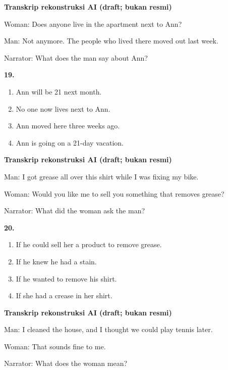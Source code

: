 \documentclass[12pt]{article}
\begin{document}
\par
\vspace{0.25\baselineskip}
\begin{exampleblock}
\textbf{Transkrip rekonstruksi AI (draft; bukan resmi)}\par
Woman: Does anyone live in the apartment next to Ann?\par
Man: Not anymore. The people who lived there moved out last week.\par
Narrator: What does the man say about Ann?\par
\end{exampleblock}
\noindent\textbf{19.}
\begin{enumerate}[label=(\Alph*),leftmargin=*,itemsep=0.2em]
\item Ann will be 21 next month.
\item No one now lives next to Ann.
\item Ann moved here three weeks ago.
\item Ann is going on a 21-day vacation.
\end{enumerate}
\par
\vspace{0.25\baselineskip}
\begin{exampleblock}
\textbf{Transkrip rekonstruksi AI (draft; bukan resmi)}\par
Man: I got grease all over this shirt while I was fixing my bike.\par
Woman: Would you like me to sell you something that removes grease?\par
Narrator: What did the woman ask the man?\par
\end{exampleblock}
\noindent\textbf{20.}
\begin{enumerate}[label=(\Alph*),leftmargin=*,itemsep=0.2em]
\item If he could sell her a product to remove grease.
\item If he knew he had a stain.
\item If he wanted to remove his shirt.
\item If she had a crease in her shirt.
\end{enumerate}
\par
\vspace{0.25\baselineskip}
\begin{exampleblock}
\textbf{Transkrip rekonstruksi AI (draft; bukan resmi)}\par
Man: I cleaned the house, and I thought we could play tennis later.\par
Woman: That sounds fine to me.\par
Narrator: What does the woman mean?\par
\end{exampleblock}
\end{document}
